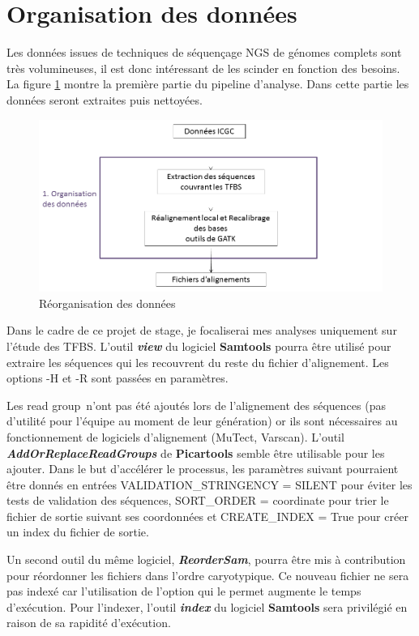 \section{Organisation des données}\label{sec: orga}

Les données issues de techniques de séquençage NGS de génomes complets sont très volumineuses, il est donc intéressant de les scinder en fonction des besoins. La figure \ref{fig:part1} montre la première partie du pipeline d'analyse. Dans cette partie les données seront extraites puis nettoyées.

\begin{figure}[h]
\centering
\includegraphics[scale=0.6]{Figures/partie1.png}
\caption{Réorganisation des données}
\label{fig:part1}
\end{figure}

Dans le cadre de ce projet de stage, je focaliserai mes analyses uniquement sur l'étude des TFBS. L'outil \textit{\textbf{view}} du logiciel \textbf{Samtools} pourra être utilisé pour extraire les séquences qui les recouvrent du reste du fichier d'alignement. Les options -H et -R sont passées en paramètres.

Les \og read group\fg ~n'ont pas été ajoutés lors de l'alignement des séquences (pas d'utilité pour l'équipe au moment de leur génération) or ils sont nécessaires au fonctionnement de logiciels d'alignement (MuTect, Varscan). L'outil \textit{\textbf{AddOrReplaceReadGroups}} de \textbf{Picartools} semble être utilisable pour les ajouter. Dans le but d'accélérer le processus, les paramètres suivant pourraient être donnés en entrées VALIDATION\_STRINGENCY = SILENT pour éviter les tests de validation des séquences, SORT\_ORDER = coordinate pour trier le fichier de sortie suivant ses coordonnées et CREATE\_INDEX = True pour créer un index du fichier de sortie.

Un second outil du même logiciel, \textit{\textbf{ReorderSam}}, pourra être mis à contribution pour réordonner les fichiers dans l'ordre caryotypique. Ce nouveau fichier ne sera pas indexé car l'utilisation de l'option qui le permet augmente le temps d'exécution. Pour l'indexer, l'outil \textit{\textbf{index}} du logiciel \textbf{Samtools} sera privilégié en raison de sa rapidité d'exécution.

